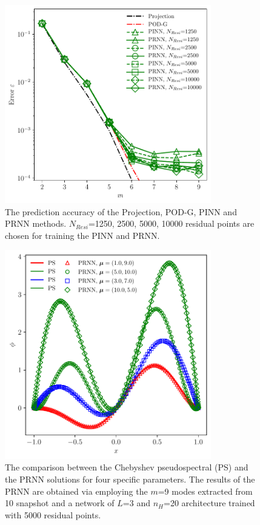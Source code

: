 \documentclass[preprint, 10pt]{elsarticle}
\begin{document}
\begin{figure}[!ht]
  \centering
  \includegraphics[width=9cm]{../../pythonNN/1DBurges/fig/ErrorComparsion_NResi.pdf}
\caption{The prediction accuracy of the Projection, POD-G, PINN and PRNN methods. $N_{Resi}$=1250, 2500, 5000, 10000 residual points are chosen for training the PINN and PRNN.}
\label{fig_1DBurgesErrorComparsion_NResi}
\end{figure}

\begin{figure}[!ht]
  \centering
  \includegraphics[width=9cm]{../../pythonNN/1DBurges/fig/ResultComparsion.pdf}
\caption{The comparison between the Chebyshev pseudospectral (PS) and the PRNN solutions for four specific parameters. The results of the PRNN are obtained via employing the $m$=9 modes extracted from 10 snapshot and a network of $L$=3 and $n_H$=20 architecture trained with 5000 residual points.}
\label{fig_1DBurgesResultComparsion}
\end{figure}
\end{document}
